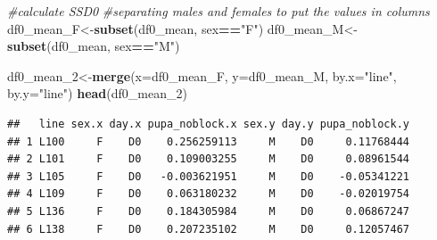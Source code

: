 \documentclass[
]{article}
\newenvironment{Shaded}{\begin{snugshade}}{\end{snugshade}}
\newcommand{\CommentTok}[1]{\textcolor[rgb]{0.56,0.35,0.01}{\textit{#1}}}
\newcommand{\DataTypeTok}[1]{\textcolor[rgb]{0.13,0.29,0.53}{#1}}
\newcommand{\DecValTok}[1]{\textcolor[rgb]{0.00,0.00,0.81}{#1}}
\newcommand{\KeywordTok}[1]{\textcolor[rgb]{0.13,0.29,0.53}{\textbf{#1}}}
\newcommand{\NormalTok}[1]{#1}
\newcommand{\OperatorTok}[1]{\textcolor[rgb]{0.81,0.36,0.00}{\textbf{#1}}}
\newcommand{\StringTok}[1]{\textcolor[rgb]{0.31,0.60,0.02}{#1}}
\begin{document}
\begin{Shaded}
\begin{Highlighting}[]
\CommentTok{#calculate SSD0}
\CommentTok{#separating males and females to put the values in columns}
\NormalTok{df0_mean_F<-}\KeywordTok{subset}\NormalTok{(df0_mean, sex}\OperatorTok{==}\StringTok{"F"}\NormalTok{)}
\NormalTok{df0_mean_M<-}\KeywordTok{subset}\NormalTok{(df0_mean, sex}\OperatorTok{==}\StringTok{"M"}\NormalTok{)}

\NormalTok{df0_mean_}\DecValTok{2}\NormalTok{<-}\KeywordTok{merge}\NormalTok{(}\DataTypeTok{x=}\NormalTok{df0_mean_F, }\DataTypeTok{y=}\NormalTok{df0_mean_M, }\DataTypeTok{by.x=}\StringTok{"line"}\NormalTok{, }\DataTypeTok{by.y=}\StringTok{"line"}\NormalTok{)}
\KeywordTok{head}\NormalTok{(df0_mean_}\DecValTok{2}\NormalTok{)}
\end{Highlighting}
\end{Shaded}

\begin{verbatim}
##   line sex.x day.x pupa_noblock.x sex.y day.y pupa_noblock.y
## 1 L100     F    D0    0.256259113     M    D0     0.11768444
## 2 L101     F    D0    0.109003255     M    D0     0.08961544
## 3 L105     F    D0   -0.003621951     M    D0    -0.05341221
## 4 L109     F    D0    0.063180232     M    D0    -0.02019754
## 5 L136     F    D0    0.184305984     M    D0     0.06867247
## 6 L138     F    D0    0.207235102     M    D0     0.12057467
\end{verbatim}

\begin{Shaded}
\end{Shaded}
\end{document}
